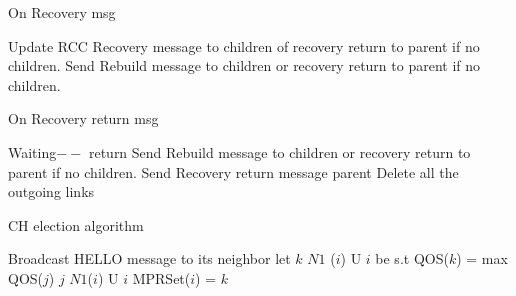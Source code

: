 \documentclass{article}
\begin{document}
\begin{algorithm}
\caption{On Recovery msg}
\label{Recovery message received}
\begin{algorithmic}[1]
\State Update RCC
\State Recovery message to children of recovery return to parent if no children.
\EndIf
{} 
\State Send Rebuild message to children or recovery return to parent if no children.
\EndIf
\EndProcedure
\end{algorithmic}
\end{algorithm}	


\begin{algorithm}
\caption{On Recovery return msg}
\label{Recovery return message received}
\begin{algorithmic}[1]
\State Waiting$--$
\State return
\EndIf
{}
\State Send Rebuild message to children or recovery return to parent if no children.
\State Send Recovery return message parent
\State Delete all the outgoing links
\EndIf
\EndProcedure
\end{algorithmic}
\end{algorithm}	

	
\begin{algorithm}
\caption{CH election algorithm}
\label{CHalgorithm}
\begin{algorithmic}[1]
\State Broadcast HELLO message to its neighbor
\State let $k$  $N1$ ($i$) U {$i$} be s.t
\State QOS($k$) = max {QOS($j$) \textbar $j$  $N1$($i$)  U $i$}
\State MPRSet($i$) = $k$
\EndFor
\EndProcedure
\end{algorithmic}
\end{algorithm}
\end{document}
